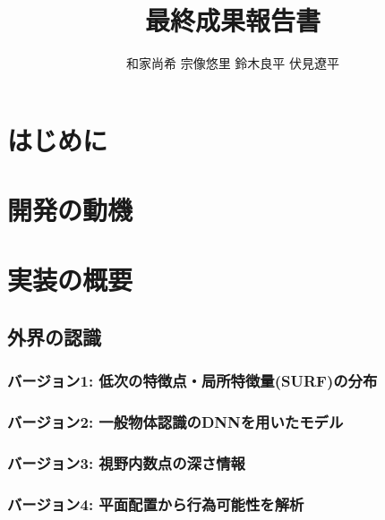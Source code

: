 \documentclass{jsarticle}
\begin{document}
 \makeatletter
    \renewcommand{\thefigure}{
    \thesection.\arabic{figure}}
  \makeatother

  \makeatletter
    \renewcommand{\thetable}{%
    \thesection.\arabic{table}}
  \makeatother

\title{最終成果報告書}
\author{和家尚希 宗像悠里 鈴木良平 伏見遼平}
\maketitle

\tableofcontents %
\thispagestyle{empty} %


\section{はじめに}
\section{開発の動機}

\section{実装の概要}
\subsection{外界の認識}
\subsubsection{バージョン1: 低次の特徴点・局所特徴量(SURF)の分布}
\subsubsection{バージョン2: 一般物体認識のDNNを用いたモデル}
\subsubsection{バージョン3: 視野内数点の深さ情報}
\subsubsection{バージョン4: 平面配置から行為可能性を解析}
\end{document}
